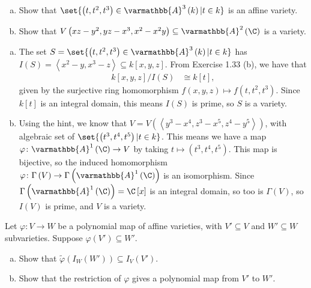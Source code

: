\documentclass[10pt]{mypackage}
\renewcommand*{\mathbb}[1]{\varmathbb{#1}}
\newcommand{\A}{\mathbb{A}}
\begin{document}
\begin{exercise}[Exercise 2.8]\hfill
  \begin{enumerate}[(a)]
    \item Show that $\set{\left( t,t^2,t^3 \right)\in \A^3\left( k \right) | t\in k}$ is an affine variety.
    \item Show that $V\left( xz-y^2,yz-x^3,x^2-x^2y \right)\subseteq \A^2\left( \C \right)$ is a variety.
  \end{enumerate}
\end{exercise}
\begin{solution}\hfill
  \begin{enumerate}[(a)]
    \item The set $S = \set{\left( t,t^2,t^3 \right)\in \A^3\left( k \right) | t\in k}$ has $I(S) = \left\langle x^2 - y, x^3 - z \right\rangle\subseteq k\left[ x,y,z \right]$. From Exercise 1.33 (b), we have that
      \begin{align*}
        k\left[ x,y,z \right]/I(S) &\cong k\left[ t \right],
      \end{align*}
      given by the surjective ring homomorphism $f\left( x,y,z \right)\mapsto f\left( t,t^2,t^3 \right)$. Since $k\left[ t \right]$ is an integral domain, this means $I(S)$ is prime, so $S$ is a variety.
    \item Using the hint, we know that $V = V\left( \left\langle y^3-x^4,z^3-x^5,z^4-y^5 \right\rangle \right)$, with algebraic set of $\set{\left( t^3,t^4,t^5 \right) | t\in k}$. This means we have a map $\varphi\colon \A^1\left( \C \right)\rightarrow V$ by taking $t\mapsto \left( t^3,t^4,t^5 \right)$. This map is bijective, so the induced homomorphism $\varphi\colon \Gamma\left( V \right)\rightarrow \Gamma\left( \A^1\left( \C \right) \right)$ is an isomorphism. Since $\Gamma\left( \A^1\left( \C \right) \right) = \C\left[ x \right]$ is an integral domain, so too is $\Gamma\left( V \right)$, so $I(V)$ is prime, and $V$ is a variety.
  \end{enumerate}
\end{solution}
\begin{exercise}[Exercise 2.9]
  Let $\varphi\colon V\rightarrow W$ be a polynomial map of affine varieties, with $V'\subseteq V$ and $W'\subseteq W$ subvarieties. Suppose $\varphi\left( V' \right)\subseteq W'$.
  \begin{enumerate}[(a)]
    \item Show that $\widetilde{\varphi}\left( I_W\left( W' \right) \right) \subseteq I_V\left( V' \right)$.
    \item Show that the restriction of $\varphi$ gives a polynomial map from $V'$ to $W'$.
  \end{enumerate}
\end{exercise}
\end{document}
